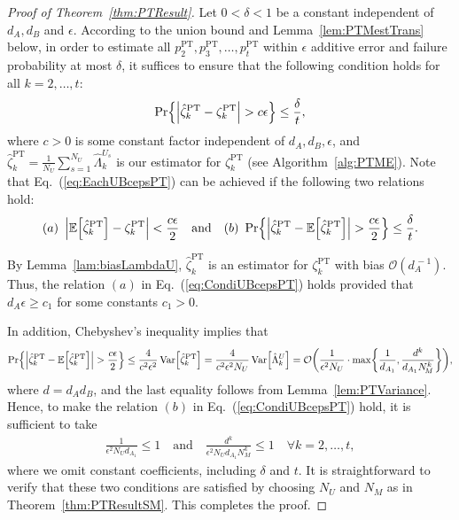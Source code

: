\documentclass[aps,prl,twocolumn,nofootinbib,superscriptaddress,10pt]{revtex4-2}
\let\originalleft\left
\let\originalright\right
\renewcommand{\left}{\mathopen{}\mathclose\bgroup\originalleft}
\renewcommand{\right}{\aftergroup\egroup\originalright}
\def\E{ {\mathbb E} } %
\DeclareMathOperator{\Var}{Var}
\newcommand{\bigo}[1]{\mathcal{O}\left(#1\right)}
\theoremstyle{plain}
\theoremstyle{definition}
\newcommand{\PT}{\mathrm{PT}}
\newcommand{\eref}[1]{Eq.~\textup{(\ref{#1})}}
\newcommand{\lref}[1]{Lemma~\ref{#1}}
\newcommand{\tref}[1]{Theorem~\ref{#1}}
\begin{document}
\begin{proof}[Proof of \tref{thm:PTResult}]
Let $0<\delta<1$ be a constant independent of $d_A,d_B$ and $\epsilon$. 
According to the union bound and \lref{lem:PTMestTrans} below, in order to estimate all 
$p_2^{\PT},p_3^{\PT},\dots,p_t^{\PT}$ within $\epsilon$ additive error and failure probability at most $\delta$, it 
suffices to ensure that the following condition holds for all $k=2,\dots,t$:  
\begin{equation}\label{eq:EachUBcepsPT}
\Pr\left\{ \left| \hat{\zeta}_k^{\PT} - \zeta_k^{\PT}\right| > c\epsilon \right\} \leq \frac{\delta}{t},
\end{equation}
where $c>0$ is some constant factor independent of $d_A,d_B,\epsilon$, and $\hat\zeta_k^{\PT} = \frac{1}{N_U} \sum_{s=1}^{N_U} \hat{\Lambda}_k^{U_s}$ is 
our estimator for $\zeta_k^{\PT}$ (see Algorithm~\ref{alg:PTME}). 
Note that \eref{eq:EachUBcepsPT} can be achieved if the following two relations hold: 
\begin{align}\label{eq:CondiUBcepsPT}
(a)\ \, \left|\E\left[ \hat\zeta_k^{\PT}\right] -\zeta_k^{\PT}\right| < \frac{c\epsilon}{2} 
\quad\text{and}\quad
(b)\ \Pr\left\{ \left|\hat\zeta_k^{\PT}-\E\left[ \hat\zeta_k^{\PT}\right] \right| > \frac{c\epsilon}{2}  \right\} \leq \frac{\delta}{t}. 
\end{align} 

By \lref{lam:biasLambdaU}, $\hat\zeta_k^{\PT}$ is 
an estimator for $\zeta_k^{\PT}$ with bias $\mathcal O(d_{\!A}^{\,-1})$. 
Thus, the relation $(a)$ in \eref{eq:CondiUBcepsPT} holds provided that $d_{\!A}\epsilon\geq c_1$ for some constants $c_1>0$.

In addition, Chebyshev's inequality implies that 
\begin{align}
\Pr\left\{ \left|\hat\zeta_k^{\PT}-\E\left[ \hat\zeta_k^{\PT}\right] \right| > \frac{c\epsilon}{2}  \right\}
\leq \frac{4}{c^2\epsilon^2} \Var\left[ \hat\zeta_k^{\PT}\right] 
= \frac{4}{c^2\epsilon^2 N_U} \Var\!\Big[ \hat{\Lambda}_k^{U} \Big] 
= \bigo{\frac{1}{\epsilon^2 N_U} \cdot \max\left\lbrace \frac{1}{d_{A_1}} ,\frac{d^{k}}{d_{A_1} N_{\!M}^{k}}\right\rbrace},  
\end{align}
where $d=d_A d_B$, and the last equality follows from \lref{lem:PTVariance}.
Hence, to make the relation $(b)$ in \eref{eq:CondiUBcepsPT} hold, it is sufficient to take 
\begin{align} 
\frac{1}{\epsilon^2 N_U d_{A_1}} \leq 1
\quad\text{and}\quad  
\frac{d^{k}}{\epsilon^2 N_U d_{A_1} N_{\!M}^{k}} \leq 1 \quad \forall k=2,\dots,t,
\end{align}
where we omit constant coefficients, including $\delta$ and $t$. 
It is straightforward to verify that these two conditions are satisfied by choosing $N_U$ and $N_M$ as in \tref{thm:PTResultSM}. 
This completes the proof. 
\end{proof}
\end{document}
